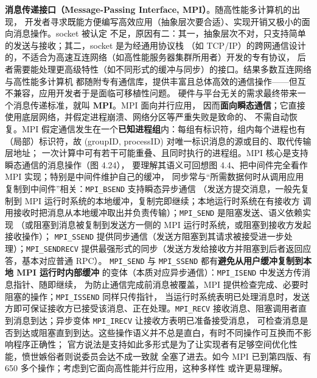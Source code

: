 \begin{closeread}
\end{closeread}

\medskip\noindent\textbf{消息传递接口（Message-Passing Interface, MPI）}。随高性能多计算机的出现，
开发者寻求既能方便编写高效应用（抽象层次要合适）、实现开销又极小的面向消息操作。socket 被认定
不足，原因有二：其一，抽象层次不对，只支持简单的发送与接收；其二，socket 是为经通用协议栈
（如 TCP/IP）的跨网通信设计的，不适合为高速互连网络（如高性能服务器集群所用者）开发的专有协议，
后者需要能处理更高级特性（如不同形式的缓冲与同步）的接口。结果多数互连网络与高性能多计算机
都随附专有通信库，提供丰富且总体高效的通信操作——但互不兼容，应用开发者于是面临可移植性问题。
硬件与平台无关的需求最终带来一个消息传递标准，就叫 \textbf{MPI}。MPI 面向并行应用，
因而\textbf{面向瞬态通信}；它直接使用底层网络，并假定进程崩溃、网络分区等严重失败是致命的、
不需自动恢复。MPI 假定通信发生在一个\textbf{已知进程组}内：每组有标识符，组内每个进程也有
（局部）标识符，故 (groupID, processID) 对唯一标识消息的源或目的、取代传输层地址；
一次计算中可有若干可能重叠、且同时执行的进程组。MPI 核心是支持瞬态通信的消息操作（图 4.24），
要理解其语义可回想图 4.4、把中间件完全看作 MPI 实现；特别是中间件维护自己的缓冲，
同步常与“所需数据何时从调用应用复制到中间件”相关：\texttt{MPI\_BSEND} 支持瞬态异步通信
（发送方提交消息，一般先复制到 MPI 运行时系统的本地缓冲，复制完即继续；本地运行时系统在有接收方
调用接收时把消息从本地缓冲取出并负责传输）；\texttt{MPI\_SEND} 是阻塞发送、语义依赖实现
（或阻塞到消息被复制到发送方一侧的 MPI 运行时系统，或阻塞到接收方发起接收操作）；
\texttt{MPI\_SSEND} 提供同步通信（发送方阻塞到其请求被接受进一步处理）；\texttt{MPI\_SENDRECV}
提供最强形式的同步（发送方发给接收方并阻塞到后者返回应答，基本对应普通 RPC）。
\texttt{MPI\_SEND} 与 \texttt{MPI\_SSEND} 都有\textbf{避免从用户缓冲复制到本地 MPI 运行时内部缓冲}
的变体（本质对应异步通信）：\texttt{MPI\_ISEND} 中发送方传消息指针、随即继续，
为防止通信完成前消息被覆盖，MPI 提供检查完成、必要时阻塞的操作；\texttt{MPI\_ISSEND} 同样只传指针，
当运行时系统表明已处理消息时，发送方即可保证接收方已接受该消息、正在处理。\texttt{MPI\_RECV}
接收消息、阻塞调用者直到消息到达；异步变体 \texttt{MPI\_IRECV} 让接收方表明已准备接受消息，
可检查消息是否到达或阻塞直到到达。这些操作语义并不总是直白，有时不同操作可互换而不影响程序正确性；
官方说法是支持如此多形式是为了让实现者有足够空间优化性能，愤世嫉俗者则说委员会达不成一致就
全塞了进去。如今 MPI 已到第四版、有 650 多个操作；考虑到它面向高性能并行应用，这种多样性
或许更易理解。

